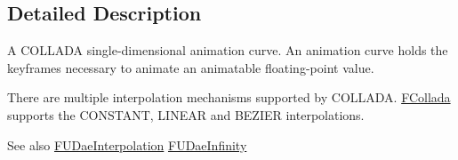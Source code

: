 \subsection{Detailed Description}
A COLLADA single-\/dimensional animation curve. An animation curve holds the keyframes necessary to animate an animatable floating-\/point value.

There are multiple interpolation mechanisms supported by COLLADA. \hyperlink{namespaceFCollada}{FCollada} supports the CONSTANT, LINEAR and BEZIER interpolations.

\begin{DoxySeeAlso}{See also}
\hyperlink{namespaceFUDaeInterpolation}{FUDaeInterpolation} \hyperlink{namespaceFUDaeInfinity}{FUDaeInfinity} 
\end{DoxySeeAlso}


